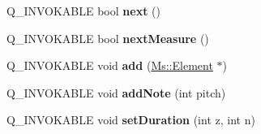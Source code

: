 \begin{DoxyCompactItemize}
Q\+\_\+\+I\+N\+V\+O\+K\+A\+B\+LE bool {\bfseries next} ()
\item 
\mbox{\label{class_ms_1_1_cursor_ae1ced84389a2b34b17302b0a801a7db3}} 
Q\+\_\+\+I\+N\+V\+O\+K\+A\+B\+LE bool {\bfseries next\+Measure} ()
\item 
\mbox{\label{class_ms_1_1_cursor_af475c72c0aca066b46af733dc0ea33c9}} 
Q\+\_\+\+I\+N\+V\+O\+K\+A\+B\+LE void {\bfseries add} (\hyperlink{class_ms_1_1_element}{Ms\+::\+Element} $\ast$)
\item 
\mbox{\label{class_ms_1_1_cursor_a42937c56c053fd5f38bb997dd9f9a3ac}} 
Q\+\_\+\+I\+N\+V\+O\+K\+A\+B\+LE void {\bfseries add\+Note} (int pitch)
\item 
\mbox{\label{class_ms_1_1_cursor_a53324e8f545ea79e0615db5b039e118d}} 
Q\+\_\+\+I\+N\+V\+O\+K\+A\+B\+LE void {\bfseries set\+Duration} (int z, int n)
\end{DoxyCompactItemize}
